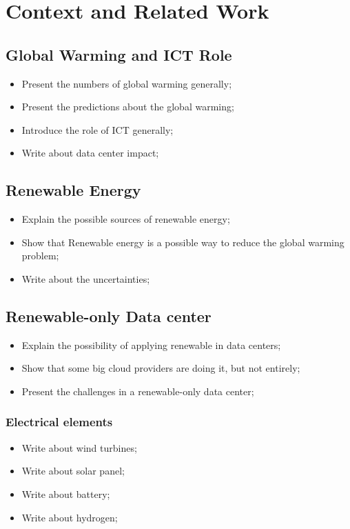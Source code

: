 \chapter{Context and Related Work}
\label{cha:related_work}
\minitoc

\section{Global Warming and ICT Role}
\begin{itemize}
    \item Present the numbers of global warming generally;
    \item Present the predictions about the global warming;
    \item Introduce the role of ICT generally;
    \item Write about data center impact;
\end{itemize}

\section{Renewable Energy}
\begin{itemize}
    \item Explain the possible sources of renewable energy;
    \item Show that Renewable energy is a possible way to reduce the global warming problem;
    \item Write about the uncertainties;
\end{itemize}

\section{Renewable-only Data center}
\begin{itemize}
    \item Explain the possibility of applying renewable in data centers;
    \item Show that some big cloud providers are doing it, but not entirely;
    \item Present the challenges in a renewable-only data center;
\end{itemize}

\subsection{Electrical elements}
\begin{itemize}
    \item Write about wind turbines;
    \item Write about solar panel;
    \item Write about battery;
    \item Write about hydrogen;
\end{itemize}

